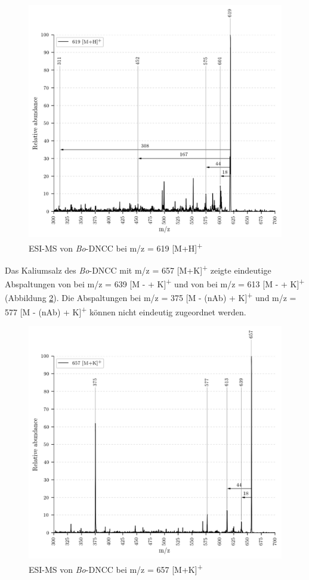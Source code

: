 \begin{figure}[!htbp]
  \includegraphics[width=\textwidth, height=0.7\textwidth]{figures/Kapitel4/Kataboliten/VWA_MS_LeafSpray_619.png}
  \caption[ESI-MS von \textit{Bo}-DNCC, Quelle: Autor]{ESI-MS von \textit{Bo}-DNCC bei m/z = 619 [M+H]\textsuperscript{+}}
  \label{fig:619MHLeafspray}
\end{figure}

Das Kaliumsalz des \textit{Bo}-DNCC mit m/z = 657 [M+K]\textsuperscript{+} zeigte eindeutige Abspaltungen von  bei m/z = 639 [M -  + K]\textsuperscript{+} und von  bei m/z = 613 [M -  + K]\textsuperscript{+} (Abbildung \ref{fig:657MKLeafspray}). Die Abspaltungen bei m/z = 375 [M - (\gls{nAb}) + K]\textsuperscript{+} und m/z = 577 [M - (\gls{nAb}) + K]\textsuperscript{+} können nicht eindeutig zugeordnet werden.

\begin{figure}[!htbp]
  \includegraphics[width=\textwidth, height=0.7\textwidth]{figures/Kapitel4/Kataboliten/VWA_MS_LeafSpray_657.png}
  \caption[ESI-MS von \textit{Bo}-DNCC, Quelle: Autor]{ESI-MS von \textit{Bo}-DNCC bei m/z = 657 [M+K]\textsuperscript{+}}
  \label{fig:657MKLeafspray}
\end{figure}

